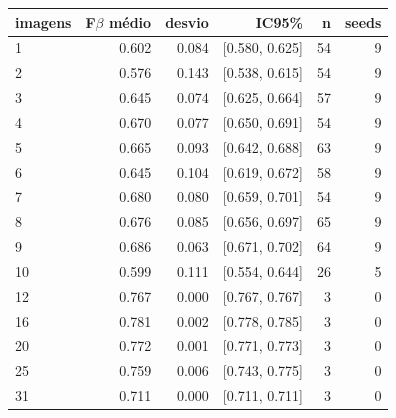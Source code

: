 \begin{tabular}{lrrrrr}
\hline
imagens & F$\beta$ médio & desvio & IC95\% & n & seeds \\
\hline
1 & 0.602 & 0.084 & [0.580, 0.625] & 54 & 9 \\
2 & 0.576 & 0.143 & [0.538, 0.615] & 54 & 9 \\
3 & 0.645 & 0.074 & [0.625, 0.664] & 57 & 9 \\
4 & 0.670 & 0.077 & [0.650, 0.691] & 54 & 9 \\
5 & 0.665 & 0.093 & [0.642, 0.688] & 63 & 9 \\
6 & 0.645 & 0.104 & [0.619, 0.672] & 58 & 9 \\
7 & 0.680 & 0.080 & [0.659, 0.701] & 54 & 9 \\
8 & 0.676 & 0.085 & [0.656, 0.697] & 65 & 9 \\
9 & 0.686 & 0.063 & [0.671, 0.702] & 64 & 9 \\
10 & 0.599 & 0.111 & [0.554, 0.644] & 26 & 5 \\
12 & 0.767 & 0.000 & [0.767, 0.767] & 3 & 0 \\
16 & 0.781 & 0.002 & [0.778, 0.785] & 3 & 0 \\
20 & 0.772 & 0.001 & [0.771, 0.773] & 3 & 0 \\
25 & 0.759 & 0.006 & [0.743, 0.775] & 3 & 0 \\
31 & 0.711 & 0.000 & [0.711, 0.711] & 3 & 0 \\
\hline
\end{tabular}
